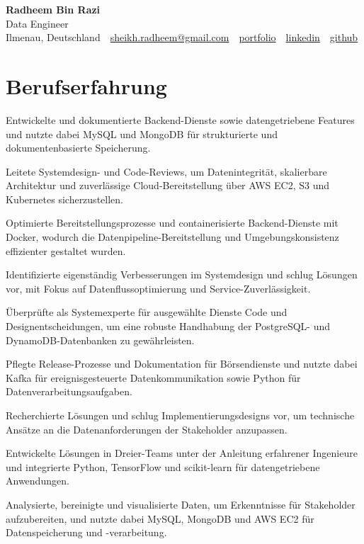 \documentclass[11pt,a4paper]{resume}
\makeatletter
\newcommand{\Portfolio}{https://radheem.github.io/my-cv}
\newcommand{\PortfolioText}{portfolio}
\newcommand{\GitHub}{https://github.com/radheem}
\newcommand{\LinkedIn}{https://www.linkedin.com/in/radheem-razi}
\newcommand{\Email}{sheikh.radheem@gmail.com}
\makeatother
\begin{document}
\clearpage
{}

\begin{center}
  {\huge\bfseries Radheem Bin Razi}\\[3pt]
  {\large Data Engineer}\\[6pt]
  \small
  Ilmenau, Deutschland \,\textbar\,
  \href{mailto:\Email}{\Email} \,\textbar\,
  \href{\Portfolio}{\PortfolioText} \,\textbar\,
  \href{\LinkedIn}{linkedin} \,\textbar\,
  \href{\GitHub}{github}
\end{center}
\vspace{2pt}

\section{Berufserfahrung}

\bullets
  \item Entwickelte und dokumentierte Backend-Dienste sowie datengetriebene Features und nutzte dabei MySQL und MongoDB für strukturierte und dokumentenbasierte Speicherung.
  \item Leitete Systemdesign- und Code-Reviews, um Datenintegrität, skalierbare Architektur und zuverlässige Cloud-Bereitstellung über AWS EC2, S3 und Kubernetes sicherzustellen.
  \item Optimierte Bereitstellungsprozesse und containerisierte Backend-Dienste mit Docker, wodurch die Datenpipeline-Bereitstellung und Umgebungskonsistenz effizienter gestaltet wurden.
\bulletsend
\vspace{3pt}
\bullets
  \item Identifizierte eigenständig Verbesserungen im Systemdesign und schlug Lösungen vor, mit Fokus auf Datenflussoptimierung und Service-Zuverlässigkeit.
  \item Überprüfte als Systemexperte für ausgewählte Dienste Code und Designentscheidungen, um eine robuste Handhabung der PostgreSQL- und DynamoDB-Datenbanken zu gewährleisten.
  \item Pflegte Release-Prozesse und Dokumentation für Börsendienste und nutzte dabei Kafka für ereignisgesteuerte Datenkommunikation sowie Python für Datenverarbeitungsaufgaben.
\bulletsend
\vspace{3pt}
\bullets
  \item Recherchierte Lösungen und schlug Implementierungsdesigns vor, um technische Ansätze an die Datenanforderungen der Stakeholder anzupassen.
  \item Entwickelte Lösungen in Dreier-Teams unter der Anleitung erfahrener Ingenieure und integrierte Python, TensorFlow und scikit-learn für datengetriebene Anwendungen.
  \item Analysierte, bereinigte und visualisierte Daten, um Erkenntnisse für Stakeholder aufzubereiten, und nutzte dabei MySQL, MongoDB und AWS EC2 für Datenspeicherung und -verarbeitung.
\bulletsend
\vspace{3pt}
\end{document}
